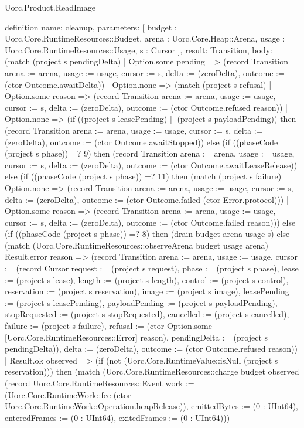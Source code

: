 \begin{lexlean}{Uorc.Product.ReadImage}
\begin{semanticmodule}
definition{
  name: cleanup,
  parameters: [
    budget : Uorc.Core.RuntimeResources::Budget,
    arena : Uorc.Core.Heap::Arena,
    usage : Uorc.Core.RuntimeResources::Usage,
    s : Cursor
  ],
  result: Transition,
  body: (match (project s pendingDelta)
    | Option.some pending => (record Transition {arena := arena, usage := usage, cursor := s, delta := (zeroDelta), outcome := (ctor Outcome.awaitDelta)})
    | Option.none => (match (project s refusal)
      | Option.some reason => (record Transition {arena := arena, usage := usage, cursor := s, delta := (zeroDelta), outcome := (ctor Outcome.refused reason)})
      | Option.none => (if ((project s leasePending) || (project s payloadPending)) then (record Transition {arena := arena, usage := usage, cursor := s, delta := (zeroDelta), outcome := (ctor Outcome.awaitStopped)}) else (if ((phaseCode (project s phase)) =? 9) then (record Transition {arena := arena, usage := usage, cursor := s, delta := (zeroDelta), outcome := (ctor Outcome.awaitLeaseRelease)}) else (if ((phaseCode (project s phase)) =? 11) then (match (project s failure)
        | Option.none => (record Transition {arena := arena, usage := usage, cursor := s, delta := (zeroDelta), outcome := (ctor Outcome.failed (ctor Error.protocol))})
        | Option.some reason => (record Transition {arena := arena, usage := usage, cursor := s, delta := (zeroDelta), outcome := (ctor Outcome.failed reason)})) else (if ((phaseCode (project s phase)) =? 8) then (drain budget arena usage s) else (match (Uorc.Core.RuntimeResources::observeArena budget usage arena)
        | Result.error reason => (record Transition {arena := arena, usage := usage, cursor := (record Cursor {request := (project s request), phase := (project s phase), lease := (project s lease), length := (project s length), control := (project s control), reservation := (project s reservation), image := (project s image), leasePending := (project s leasePending), payloadPending := (project s payloadPending), stopRequested := (project s stopRequested), cancelled := (project s cancelled), failure := (project s failure), refusal := (ctor Option.some [Uorc.Core.RuntimeResources::Error] reason), pendingDelta := (project s pendingDelta)}), delta := (zeroDelta), outcome := (ctor Outcome.refused reason)})
        | Result.ok observed => (if (not (Uorc.Core.RuntimeValue::isNull (project s reservation))) then (match (Uorc.Core.RuntimeResources::charge budget observed (record Uorc.Core.RuntimeResources::Event {work := (Uorc.Core.RuntimeWork::fee (ctor Uorc.Core.RuntimeWork::Operation.heapRelease)), emittedBytes := (0 : UInt64), enteredFrames := (0 : UInt64), exitedFrames := (0 : UInt64)}))
}
\end{semanticmodule}
\end{lexlean}
